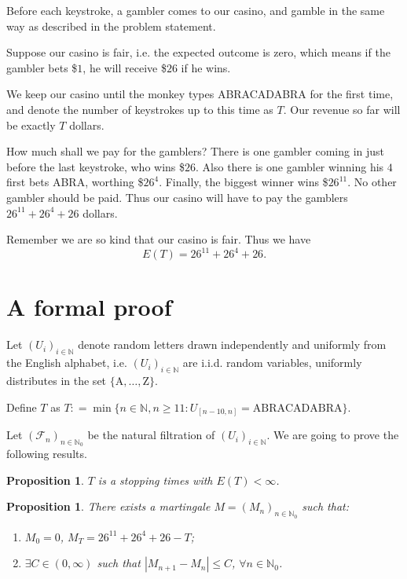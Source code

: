 \documentclass{article}
\newtheorem{proposition}[theorem]{Proposition}
\begin{document}
    Before each keystroke, a gambler comes to our casino, and gamble in the same way as described in the problem statement.

    Suppose our casino is fair, i.e. the expected outcome is zero,
    which means if the gambler bets \$$1$, he will receive \$$26$ if he wins.

    We keep our casino until the monkey types ABRACADABRA for the first time,
    and denote the number of keystrokes up to this time as $T$.
    Our revenue so far will be exactly $T$ dollars.

    How much shall we pay for the gamblers?
    There is one gambler coming in just before the last keystroke, who wins \$$26$.
    Also there is one gambler winning his $4$ first bets ABRA, worthing \$$26^4$.
    Finally, the biggest winner wins \$$26^{11}$.
    No other gambler should be paid. 
    Thus our casino will have to pay the gamblers $26^{11} + 26^4 + 26$ dollars.

    Remember we are so kind that our casino is fair.
    Thus we have $$E(T) = 26^{11} + 26^4 + 26.$$

    \section{A formal proof}
    Let $(U_i)_{i \in \mathbb N}$ denote random letters drawn independently and uniformly from the English alphabet,
    i.e. $(U_i)_{i \in \mathbb N}$ are i.i.d. random variables, uniformly distributes in the set $\{\text{A}, \dots, \text{Z}\}$.

    Define $T$ as $T \mathrel{\mathop:}= \min\{n \in \mathbb N, n \geq 11 : U_{[n-10, n]} = \text{ABRACADABRA}\}$.

    Let $(\mathcal F_n)_{n \in \mathbb N_0}$ be the natural filtration of $(U_i)_{i \in \mathbb N}$.
    We are going to prove the following results.

    \begin{proposition}
      $T$ is a stopping times with $E(T) < \infty$.
    \end{proposition}

    \begin{proposition}
      There exists a martingale $M = (M_n)_{n \in \mathbb N_0}$ such that:
        \begin{enumerate}
          \item $M_0 = 0$, $M_T = 26^11 + 26^4 + 26 - T$;
          \item $\exists C \in (0, \infty)$ such that $|M_{n+1} - M_n| \leq C$, $\forall n \in \mathbb N_0$.
        \end{enumerate}
    \end{proposition}
\end{document}
